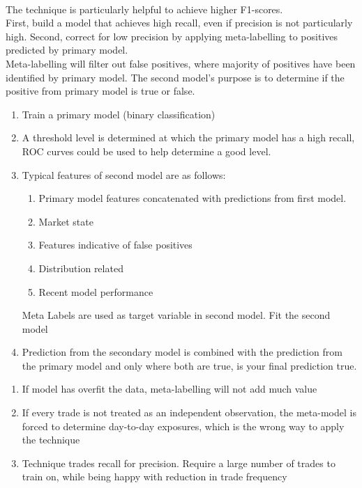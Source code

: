 \begin{method} \\
The technique is particularly helpful to achieve higher F1-scores.\\
First, build a model that achieves high recall, even if precision is not particularly high. Second, correct for low precision by applying meta-labelling to positives predicted by primary model.\\
Meta-labelling will filter out false positives, where majority of positives have been identified by primary model. The second model's purpose is to determine if the positive from primary model is true or false.
\begin{enumerate}[label=\roman*.]
\setlength{\itemsep}{0pt}
\item Train a primary model (binary classification)
\item A threshold level is determined at which the primary model has a high recall, ROC curves could be used to help determine a good level.
\item Typical features of second model are as follows:
\begin{enumerate}[label=\roman*.]
\setlength{\itemsep}{0pt}
\item Primary model features concatenated with predictions from first model.
\item Market state
\item Features indicative of false positives
\item Distribution related
\item Recent model performance
\end{enumerate}
Meta Labels are used as target variable in second model. Fit the second model
\item Prediction from the secondary model is combined with the prediction from the primary model and only where both are true, is your final prediction true.
\end{enumerate}
\end{method}

\begin{remark} 
\begin{enumerate}[label=\roman*.]
\setlength{\itemsep}{0pt}
\item If model has overfit the data, meta-labelling will not add much value
\item If every trade is not treated as an independent observation, the meta-model is forced to determine day-to-day exposures, which is the wrong way to apply the technique
\item Technique trades recall for precision. Require a large number of trades to train on, while being happy with reduction in trade frequency
\end{enumerate}
\end{remark}